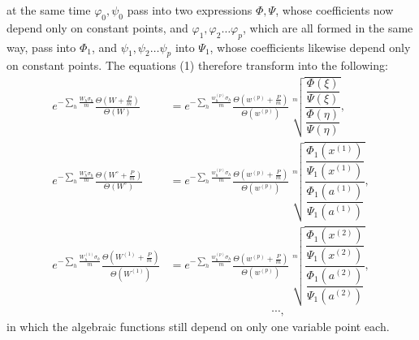 \documentclass[10pt]{article}
\begin{document}
at the same time \(\varphi_0,\psi_0\) pass into two expressions \(\Phi,\Psi\), whose coefficients now depend only on constant points, and \(\varphi_1,\varphi_2\ldots\varphi_p\), which are all formed in the same way, pass into \(\Phi_1\), and \(\psi_1,\psi_2\ldots\psi_p\) into \(\Psi_1\), whose coefficients likewise depend only on constant points. The equations (1) therefore transform into the following:
\[
\begin{aligned}
e^{-\sum_h\frac{W_h\sigma_h}{m}}
\frac{\Theta\left(W+\frac Pm\right)}{\Theta(W)}
&=
e^{-\sum_h\frac{w_h^{(p)}\sigma_h}{m}}
\frac{\Theta\left(w^{(p)}+\frac Pm\right)}{\Theta(w^{(p)})}
\sqrt[m]{\dfrac{\dfrac{\Phi(\xi)}{\Psi(\xi)}}{\dfrac{\Phi(\eta)}{\Psi(\eta)}}},\\
e^{-\sum_h\frac{W_h^\circ\sigma_h}{m}}
\frac{\Theta\left(W^\circ+\frac Pm\right)}{\Theta(W^\circ)}
&=
e^{-\sum_h\frac{w_h^{(p)}\sigma_h}{m}}
\frac{\Theta\left(w^{(p)}+\frac Pm\right)}{\Theta(w^{(p)})}
\sqrt[m]{\dfrac{\dfrac{\Phi_1(x^{(1)})}{\Psi_1(x^{(1)})}}{\dfrac{\Phi_1(a^{(1)})}{\Psi_1(a^{(1)})}}},\\
e^{-\sum_h\frac{W_h^{(1)}\sigma_h}{m}}
\frac{\Theta\left(W^{(1)}+\frac Pm\right)}{\Theta(W^{(1)})}
&=
e^{-\sum_h\frac{w_h^{(p)}\sigma_h}{m}}
\frac{\Theta\left(w^{(p)}+\frac Pm\right)}{\Theta(w^{(p)})}
\sqrt[m]{\dfrac{\dfrac{\Phi_1(x^{(2)})}{\Psi_1(x^{(2)})}}{\dfrac{\Phi_1(a^{(2)})}{\Psi_1(a^{(2)})}}},\\
&\hspace{9em}\cdots,
\end{aligned}
\]
in which the algebraic functions still depend on only one variable point each.
\end{document}
